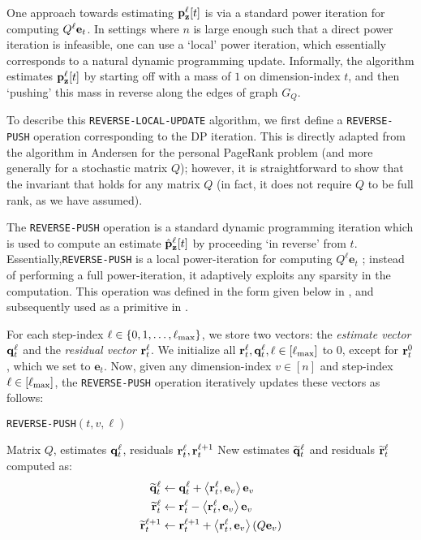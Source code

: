 One approach towards estimating ${\mathbf{p}}_\mathbf{z}^{\ell}[t]$ is via a standard power iteration for computing $Q^{\ell}\mathbf{e}_t$. 
In settings where $n$ is large enough such that a direct power iteration is infeasible, one can use a `local' power iteration, which essentially corresponds to a natural dynamic programming update. Informally, the algorithm estimates ${\mathbf{p}}_\mathbf{z}^{\ell}[t]$ by starting off with a mass of $1$ on dimension-index $t$, and then `pushing' this mass in reverse along the edges of graph $G_Q$. 

To describe this \texttt{REVERSE-LOCAL-UPDATE} algorithm, we first define a \texttt{REVERSE-PUSH} operation corresponding to the DP iteration. 
This is directly adapted from the algorithm in Andersen \cite{andersen2007local} for the personal PageRank problem (and more generally for a stochastic matrix $Q$); however, it is straightforward to show that the invariant that holds for any matrix $Q$ (in fact, it does not require $Q$ to be full rank, as we have assumed).
 
The \texttt{REVERSE-PUSH} operation is a standard dynamic programming iteration which is used to compute an estimate $\hat{\mathbf{p}}_\mathbf{z}^{\ell}[t]$ by proceeding `in reverse' from $t$. 
Essentially,\texttt{REVERSE-PUSH} is a local power-iteration for computing $Q^{\ell}\mathbf{e}_t$ ; instead of performing a full power-iteration, it adaptively exploits any sparsity in the computation.
This operation was defined in the form given below in \cite{andersen2007local}, and subsequently used as a primitive in \cite{banerjee2015fast, lee2014asynchronous}.


For each step-index $\ell\in\{0,1,\ldots,\ell_{\max}\}$, we store two vectors: the \emph{estimate vector} $\mathbf{q}^{\ell}_t$ and the \emph{residual vector} $\mathbf{r}^{\ell}_t$.
We initialize all $\mathbf{r}^{\ell}_t,\mathbf{q}^{\ell}_t, \ell\in[\ell_{\max}]$ to $0$, except for $\mathbf{r}^{0}_t$, which we set to $\mathbf{e}_t$.
Now, given any dimension-index $v\in[n]$ and step-index $\ell\in[\ell_{\max}]$, the \texttt{REVERSE-PUSH} operation iteratively updates these vectors as follows:
\begin{algorithm}[!ht]
\caption{\texttt{REVERSE-PUSH}$(t,v,\ell)$}
\label{alg:push}
\begin{algorithmic}[1]
\REQUIRE Matrix $Q$, estimates $\mathbf{q}^{\ell}_t$, residuals $\mathbf{r}^{\ell}_t,\mathbf{r}^{\ell+1}_t$
\RETURN New estimates $\widetilde{\mathbf{q}}^{\ell}_t$ and residuals $\widetilde{\mathbf{r}}^{\ell}_t$ computed as:
\begin{align*}
	\widetilde{\mathbf{q}}^{\ell}_t &\leftarrow \mathbf{q}^{\ell}_t + \left< \mathbf{r}^{\ell}_t, \mathbf{e}_v \right>\mathbf{e}_v \\
	\widetilde{\mathbf{r}}^{\ell}_t &\leftarrow \mathbf{r}^{\ell}_t - \left< \mathbf{r}^{\ell}_t, \mathbf{e}_v \right>\mathbf{e}_v \\
	\widetilde{\mathbf{r}}^{\ell+1}_t &\leftarrow \mathbf{r}^{\ell+1}_t + \left< \mathbf{r}^{\ell}_t, \mathbf{e}_v \right>(Q\mathbf{e}_v)
\end{align*}	
\end{algorithmic}
\end{algorithm}    

